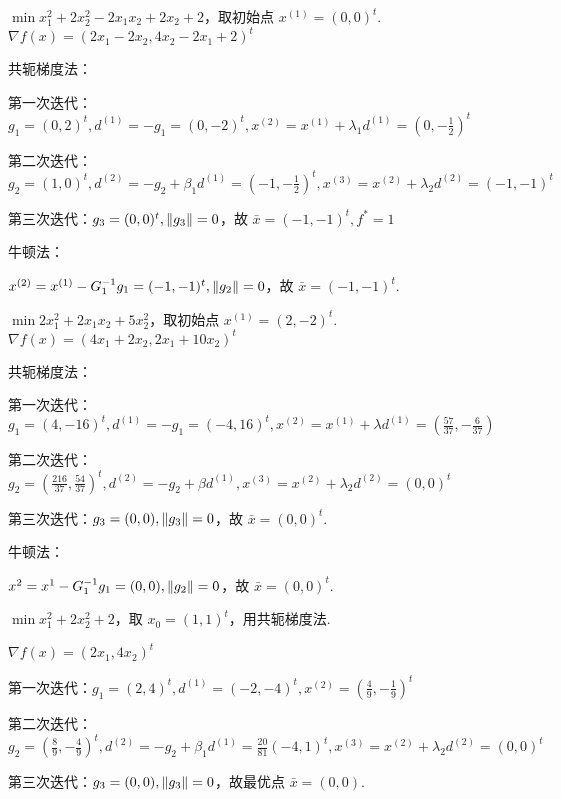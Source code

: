 \begin{problem}
    $\min x_1^2 + 2x_2^2 - 2x_1x_2 + 2x_2 + 2$，取初始点 $x^{(1)} = (0, 0)^t$.
    \Answer $\nabla f(x) = (2x_1 - 2x_2, 4x_2 - 2x_1 + 2)^t$
    
    共轭梯度法：
    
    第一次迭代：$g_1 = (0, 2)^t, d^{(1)} = -g_1 = (0, -2)^t, x^{(2)} = x^{(1)} + \lambda_1d^{(1)} = (0, -\frac{1}{2})^t$

    第二次迭代：$g_2 = (1, 0)^t, d^{(2)} = -g_2 + \beta_1d^{(1)} = (-1, -\frac{1}{2})^t, x^{(3)} = x^{(2)} + \lambda_2d^{(2)} = (-1, -1)^t$

    第三次迭代：$g_3 = (0, 0)^t, \norm{g_3} = 0$，故 $\bar{x} = (-1, -1)^t, f^* = 1$

    牛顿法：

    $x^{(2)} = x^{(1)} - G_1^{-1}g_1 = (-1, -1)^t, \norm{g_2} = 0$，故 $\bar{x} = (-1, -1)^t$.
\end{problem}

\begin{problem}
    $\min 2x_1^2 + 2x_1x_2 + 5x_2^2$，取初始点 $x^{(1)} = (2, -2)^t$.
    \Answer $\nabla f(x) = (4x_1 + 2x_2, 2x_1 + 10x_2)^t$

    共轭梯度法：

    第一次迭代：$g_1 = (4, -16)^t, d^{(1)} = -g_1 = (-4, 16)^t, x^{(2)} = x^{(1)} + \lambda d^{(1)} = (\frac{57}{37}, -\frac{6}{37})$

    第二次迭代：$g_2 = (\frac{216}{37}, \frac{54}{37})^t, d^{(2)} = -g_2 + \beta d^{(1)}, x^{(3)} = x^{(2)} + \lambda_2 d^{(2)} = (0, 0)^t$

    第三次迭代：$g_3 = (0, 0), \norm{g_3} = 0$，故 $\bar{x} = (0, 0)^t$.

    牛顿法：

    $x^{2} = x^{1} - G_1^{-1}g_1 = (0, 0), \norm{g_2} = 0$，故 $\bar{x} = (0, 0)^t$.
\end{problem}

\begin{problem}
    $\min x_1^2 + 2x_2^2 + 2$，取 $x_0 = (1, 1)^t$，用共轭梯度法.

    \Answer $\nabla f(x) = (2x_1, 4x_2)^t$

    第一次迭代：$g_1 = (2, 4)^t, d^{(1)} = (-2, -4)^t, x^{(2)} = (\frac{4}{9}, -\frac{1}{9})^t$

    第二次迭代：$g_2 = (\frac{8}{9}, -\frac{4}{9})^t, d^{(2)} = -g_2 + \beta_1d^{(1)} = \frac{20}{81}(-4, 1)^t, x^{(3)} = x^{(2)} + \lambda_2d^{(2)} = (0, 0)^t$

    第三次迭代：$g_3 = (0, 0), \norm{g_3} = 0$，故最优点 $\bar{x} = (0, 0)$.
\end{problem}

